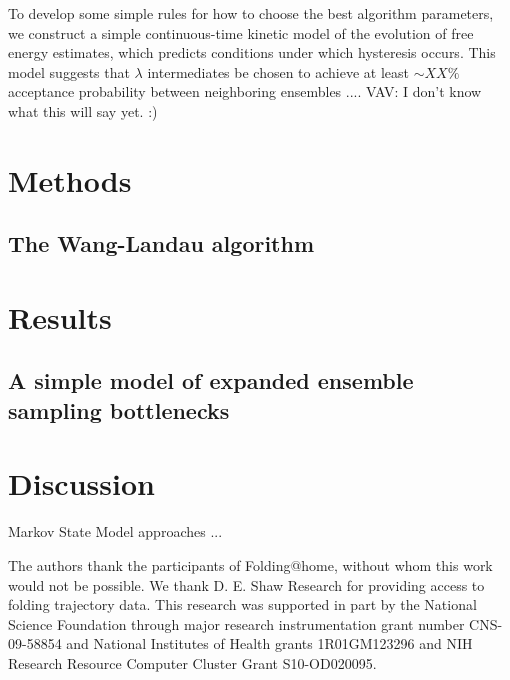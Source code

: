 \documentclass[%
 aip,
rsi,%
 amsmath,amssymb,
 reprint,%
]{revtex4-1}
\begin{document}
To develop some simple rules for how to choose the best algorithm parameters, we construct a simple continuous-time kinetic model of the evolution of free energy estimates, which predicts conditions under which hysteresis occurs.  \color{red} This model suggests that $\lambda$ intermediates be chosen to achieve at least $\sim XX\%$ acceptance probability between neighboring ensembles .... VAV:  I don't know what this will say yet. :) \color{black}

\section*{Methods}

\subsection{The Wang-Landau algorithm}




\section*{Results}

\subsection*{A simple model of expanded ensemble sampling bottlenecks}




\section*{Discussion}

Markov State Model approaches ...

\begin{acknowledgments}
The authors thank the participants of Folding@home, without whom this work would not be possible.  We thank D. E. Shaw Research for providing access to folding trajectory data. This research was supported in part by the National Science Foundation through major research instrumentation grant number CNS-09-58854 and National Institutes of Health grants 1R01GM123296 and NIH Research Resource Computer Cluster Grant S10-OD020095.
\end{acknowledgments}

%


\end{document}
